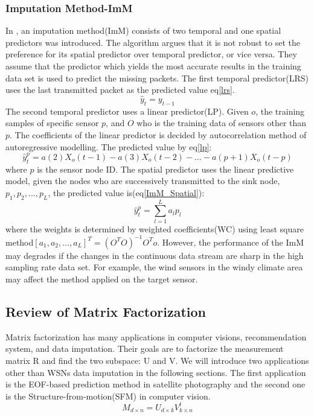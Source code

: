 \subsubsection{Imputation Method-ImM}
 In \cite{Lim:robust}, an imputation method(ImM) consists of two temporal and one spatial predictors was introduced.  The algorithm argues that it is not robust to set the preference for its spatial predictor over temporal predictor, or vice versa.
They assume that the predictor which yields the most accurate results in the training data set is used to predict the missing packets. 
The first temporal predictor(LRS) uses the last transmitted packet as the predicted value eq\ref{lrs}.
\begin{equation}
\hat{y}_{t} =y_{t-1} \label{lrs}
\end{equation} 
 The second temporal predictor uses a linear predictor(LP). Given $o$, the training samples of specific sensor $p$, and $O$ who is the training data of sensors other than $p$. The coefficients of the linear predictor is decided by autocorrelation method of autoregressive modelling. The predicted value by eq\ref{lp}:
\begin{equation}
\hat{y}_{t}^p = a(2)X_o(t-1) - a(3)X_o(t-2)- \dots -a(p+1)X_o(t-p) \label{lp}
\end{equation} 
where $p$ is the sensor node ID.  
The spatial predictor uses the linear predictive model, given the nodes who are successively transmitted to the sink node, $p_1,p_2,\dots,p_L$, the predicted value is(eq\ref{ImM_Spatial}): 
\begin{equation}
\hat{y}_{t}^p = \sum_{l=1}^L a_lp_l
\label{ImM_Spatial}
\end{equation}
 where the weights is determined by weighted coefficients(WC) using least square method$[a_1,a_2,\dots,a_L]^T = (O^TO)^{-1}O^To$.
However, the performance of the ImM may degrades if the changes in the continuous data stream are sharp in the high sampling rate data set. 
For example, the wind sensors in the windy climate area may affect the method applied on the target sensor.  
\subsection{Review of Matrix Factorization  }
Matrix factorization has many applications in computer visions, recommendation system\cite{chen2011linear}, and data imputation. Their goals are to factorize the measurement matrix R and find the two subspace: U and V. We will introduce two applications other than WSNs data imputation in the following sections. The first application is the EOF-based prediction method in satellite photography and the second one is the Structure-from-motion(SFM) in computer vision.
\begin{equation}
M_{d\times n}= U_{d\times k}V^t_{k\times n}
\end{equation}
